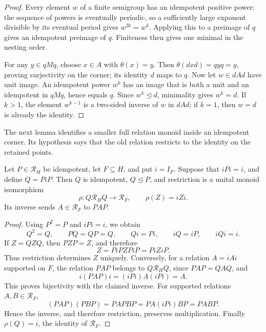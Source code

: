 \begin{proof}
Every element $w$ of a finite semigroup has an idempotent positive
power: the sequence of powers is eventually periodic, so a
sufficiently large exponent divisible by its eventual period gives
$w^{2k}=w^k$.  Applying this to a preimage of $q$ gives an
idempotent preimage of $q$.  Finiteness then gives one minimal in
the nesting order.

For any $y\in qMq$, choose $x\in A$ with $\theta(x)=y$.
Then $\theta(dxd)=qyq=y$, proving surjectivity on the corner;
its identity $d$ maps to $q$.  Now let $w\in dAd$ have unit image.
An idempotent power $w^k$ has an image that is both a unit and an
idempotent in $qMq$, hence equals $q$.  Since
$w^k\trianglelefteq d$, minimality gives $w^k=d$.  If $k>1$,
the element $w^{k-1}$ is a two-sided inverse of $w$ in $dAd$;
if $k=1$, then $w=d$ is already the identity.
\end{proof}

The next lemma identifies a smaller full relation monoid inside an
idempotent corner.  Its hypothesis says that the old relation
restricts to the identity on the retained points.

\begin{lemma}
\label{amp:relation-corner}
Let $P\in\mathcal R_H$ be idempotent, let $F\subseteq H$, and
put $i=I_F$.  Suppose that $iPi=i$, and define $Q=PiP$.
Then $Q$ is idempotent, $Q\trianglelefteq P$, and restriction is
a unital monoid isomorphism
\begin{equation}
 \rho:Q\mathcal R_HQ\longrightarrow\mathcal R_F,
 \qquad \rho(Z)=iZi.
 \label{amp:restriction}
\end{equation}
Its inverse sends $A\in\mathcal R_F$ to $PAP$.
\end{lemma}

\begin{proof}
Using $P^2=P$ and $iPi=i$, we obtain
\[
 Q^2=Q,\qquad PQ=QP=Q,\qquad
 Qi=Pi,\qquad iQ=iP,\qquad iQi=i.
\]
If $Z=QZQ$, then $PZP=Z$, and therefore
\[
 Z=PiPZPiP=PiZiP.
\]
Thus restriction determines $Z$ uniquely.  Conversely, for a
relation $A=iAi$ supported on $F$, the relation $PAP$ belongs to
$Q\mathcal R_HQ$, since $PAP=QAQ$, and
\[
 i(PAP)i=(iPi)A(iPi)=A.
\]
This proves bijectivity with the claimed inverse.  For supported
relations $A,B\in\mathcal R_F$,
\[
 (PAP)(PBP)=PAPBP
           =PA(iPi)BP
           =PABP.
\]
Hence the inverse, and therefore restriction, preserves
multiplication.  Finally $\rho(Q)=i$, the identity of
$\mathcal R_F$.
\end{proof}

